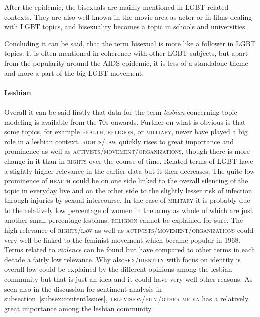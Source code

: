 \documentclass[10pt,a4paper,twocolumn]{scrartcl}
\begin{document}
After the epidemic, the bisexuals are mainly mentioned in LGBT-related contexts. They are also well known in the movie area as actor or in films dealing with LGBT topics, and bisexuality becomes a topic in schools and universities.

Concluding it can be said, that the term bisexual is more like a follower in LGBT topics: It is often mentioned in coherence with other LGBT subjects, but apart from the popularity around the AIDS-epidemic, it is less of a standalone theme and more a part of the big LGBT-movement.

\paragraph*{Lesbian} Overall it can be said firstly that data for the term \textit{lesbian} concerning topic modeling is available from the 70s onwards. Further on what is obvious is that some topics, for example \textsc{health}, \textsc{religion}, or \textsc{military}, never have played a big role in a lesbian context. \textsc{rights/law} quickly rises to great importance and prominence as well as \textsc{activists/movement/organizations}, though there is more change in it than in \textsc{rights} over the course of time. Related terms of LGBT have a slightly higher relevance in the earlier data but it then decreases. The quite low prominence of \textsc{health} could be on one side linked to the overall silencing of the topic in everyday live and on the other side to the slightly lesser risk of infection through injuries by sexual intercourse. In the case of \textsc{military} it is probably due to the relatively low percentage of women in the army as whole of which are just another small percentage lesbians. \textsc{religion} cannot be explained for sure. The high relevance of \textsc{rights/law} as well as \textsc{activists/movement/organizations} could very well be linked to the feminist movement which became popular in 1968. Terms related to \textit{violence} can be found but have compared to other terms in each decade a fairly low relevance. Why also\textsc{sex/identity} with focus on identity is overall low could be explained by the different opinions among the lesbian community but that is just an idea and it could have very well other reasons. As seen also in the discussion for sentiment analysis in subsection~\ref{subsex:contentIssues}, \textsc{television/film/other media} has a relatively great importance among the lesbian community.
\end{document}

